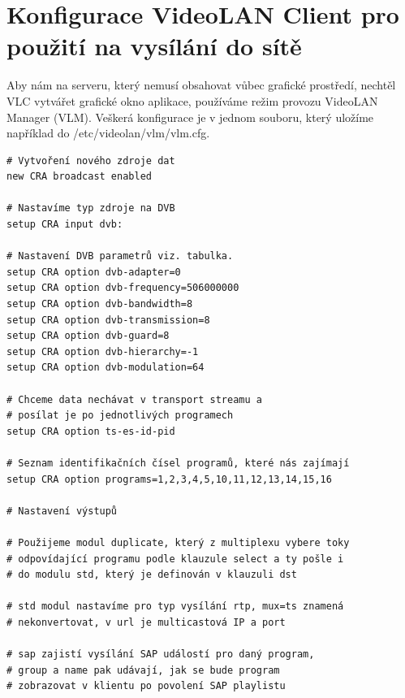 \section{Konfigurace VideoLAN Client pro použití na vysílání do sítě}

Aby nám na serveru, který nemusí obsahovat vůbec grafické prostředí, nechtěl VLC vytvářet grafické okno aplikace, používáme režim provozu VideoLAN Manager (VLM). Veškerá konfigurace je v jednom souboru, který uložíme například do /etc/videolan/vlm/vlm.cfg.

\begin{small}
\begin{verbatim}
# Vytvoření nového zdroje dat
new CRA broadcast enabled

# Nastavíme typ zdroje na DVB
setup CRA input dvb:

# Nastavení DVB parametrů viz. tabulka.
setup CRA option dvb-adapter=0
setup CRA option dvb-frequency=506000000
setup CRA option dvb-bandwidth=8
setup CRA option dvb-transmission=8
setup CRA option dvb-guard=8
setup CRA option dvb-hierarchy=-1
setup CRA option dvb-modulation=64

# Chceme data nechávat v transport streamu a 
# posílat je po jednotlivých programech
setup CRA option ts-es-id-pid

# Seznam identifikačních čísel programů, které nás zajímají
setup CRA option programs=1,2,3,4,5,10,11,12,13,14,15,16

# Nastavení výstupů

# Použijeme modul duplicate, který z multiplexu vybere toky
# odpovídající programu podle klauzule select a ty pošle i
# do modulu std, který je definován v klauzuli dst

# std modul nastavíme pro typ vysílání rtp, mux=ts znamená
# nekonvertovat, v url je multicastová IP a port

# sap zajistí vysílání SAP událostí pro daný program,
# group a name pak udávají, jak se bude program
# zobrazovat v klientu po povolení SAP playlistu


\end{verbatim}
\end{small}
